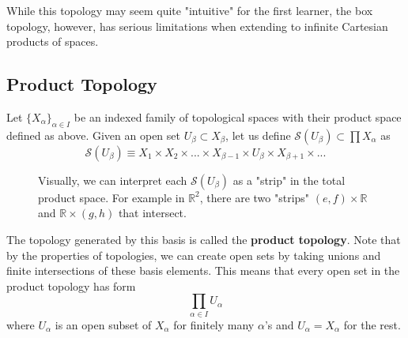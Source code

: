   While this topology may seem quite "intuitive" for the first learner, the box topology, however, has serious limitations when extending to infinite Cartesian products of spaces. 

\subsection{Product Topology}

  \begin{theorem}
    Let $\{X_\alpha\}_{\alpha \in I}$ be an indexed family of topological spaces with their product space defined as above. Given an open set $U_\beta \subset X_\beta$, let us define $\mathscr{S} (U_\beta) \subset \prod X_\alpha$ as 
    \begin{equation}
      \mathscr{S}(U_\beta) \equiv X_1 \times X_2 \times ... \times X_{\beta -1} \times U_\beta \times X_{\beta+1} \times ... 
    \end{equation}
    \begin{figure}[H]
      \centering 
      \caption{Visually, we can interpret each $\mathscr{S} (U_\beta)$ as a "strip" in the total product space. For example in $\mathbb{R}^2$, there are two "strips" $(e, f) \times \mathbb{R}$ and $\mathbb{R} \times (g, h)$ that intersect. }
      \label{fig:product_topology}
    \end{figure}
    The topology generated by this basis is called the \textbf{product topology}. Note that by the properties of topologies, we can create open sets by taking unions and finite intersections of these basis elements. This means that every open set in the product topology has form
    \begin{equation}
      \prod_{\alpha \in I} U_\alpha
    \end{equation}
    where $U_\alpha$ is an open subset of $X_\alpha$ for finitely many $\alpha$'s and $U_\alpha = X_\alpha$ for the rest. 
  \end{theorem}

